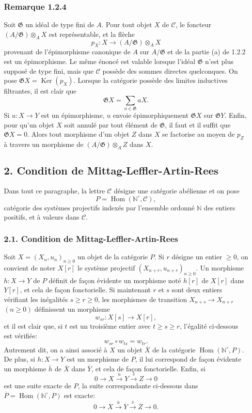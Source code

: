 \documentclass[11pt]{article}
\providecommand{\NN}{\mathbb{N}}
\DeclareMathOperator{\Hom}{Hom}
\providecommand{\Ker}{\operatorname{Ker}}
\providecommand{\Hom}{\operatorname{Hom}}
\providecommand{\NN}{\mathbb N}
\providecommand{\cC}{\mathcal C}
\providecommand{\cG}{\mathfrak G}
\providecommand{\Ker}{\operatorname{Ker}}
\providecommand{\Ker}{\operatorname{Ker}}
\providecommand{\cC}{\mathcal C}
\providecommand{\Hom}{\operatorname{Hom}}
\begin{document}
\subsubsection*{Remarque 1.2.4}
Soit $\cG$ un idéal de type fini de $A$. Pour tout objet $X$ de $\cC$, le foncteur $(A/\cG)\otimes_A X$ est représentable, et la flèche
\[
p_X:X\longrightarrow (A/\cG)\otimes_A X
\]
provenant de l'épimorphisme canonique de $A$ sur $A/\cG$ et de la partie (a) de 1.2.2 est un épimorphisme. Le même énoncé est valable lorsque l'idéal $\cG$ n'est plus supposé de type fini, mais que $\cC$ possède des sommes directes quelconques. On pose $\cG X=\Ker(p_X)$. Lorsque la catégorie possède des limites inductives filtrantes, il est clair que
\[
\cG X=\sum_{a\in\cG}aX.
\]
Si $u:X\to Y$ est un épimorphisme, $u$ envoie épimorphiquement $\cG X$ sur $\cG Y$. Enfin, pour qu'un objet $X$ soit annulé par tout élément de $\cG$, il faut et il suffit que $\cG X=0$. Alors tout morphisme d'un objet $Z$ dans $X$ se factorise au moyen de $p_Z$ à travers un morphisme de $(A/\cG)\otimes_A Z$ dans $X$.

\subsection*{2. Condition de Mittag-Leffler-Artin-Rees}
Dans tout ce paragraphe, la lettre $\cC$ désigne une catégorie abélienne et on pose
\[
P=\Hom(\NN^\circ,\cC),
\]
catégorie des systèmes projectifs indexés par l'ensemble ordonné $\NN$ des entiers positifs, et à valeurs dans $\cC$.

\subsubsection*{2.1. Condition de Mittag-Leffler-Artin-Rees}
Soit $X=(X_n,u_n)_{n\ge0}$ un objet de la catégorie $P$. Si $r$ désigne un entier $\ge0$, on convient de noter $X[r]$ le système projectif $(X_{n+r},u_{n+r})_{n\ge0}$. Un morphisme $h:X\to Y$ de $P$ définit de façon évidente un morphisme noté $h[r]$ de $X[r]$ dans $Y[r]$, et cela de façon fonctorielle. Si maintenant $r$ et $s$ sont deux entiers vérifiant les inégalités $s\ge r\ge0$, les morphismes de transition $X_{n+s}\to X_{n+r}$ $(n\ge0)$ définissent un morphisme
\[
w_{sr}:X[s]\longrightarrow X[r],
\]
et il est clair que, si $t$ est un troisième entier avec $t\ge s\ge r$, l'égalité ci-dessous est
vérifiée:
\[
w_{sr}\circ w_{ts}=w_{tr}.
\]
Autrement dit, on a ainsi associé à $X$ un objet $\overline X$ de la catégorie $\Hom(\NN^\circ,P)$. De plus, si $h:X\to Y$ est un morphisme de $P$, il lui correspond de façon évidente un morphisme $\overline h$ de $\overline X$ dans $\overline Y$, et cela de façon fonctorielle. Enfin, si
\[
0\longrightarrow X\stackrel{u}{\longrightarrow}Y\stackrel{v}{\longrightarrow}Z\longrightarrow0
\]
est une suite exacte de $P$, la suite correspondante ci-dessous dans $\overline P=\Hom(\NN^\circ,P)$ est exacte:
\[
0\longrightarrow\overline X\stackrel{\overline u}{\longrightarrow}\overline Y\stackrel{\overline v}{\longrightarrow}\overline Z\longrightarrow0.
\]
\end{document}
